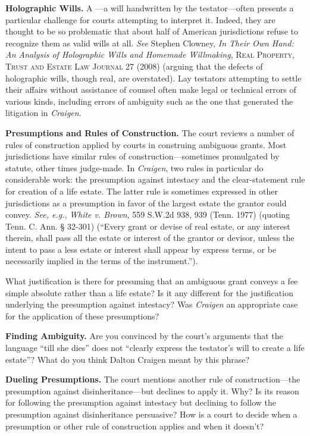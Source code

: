 
\item \textbf{Holographic Wills.} A ---a will handwritten
by the
testator---often presents a particular challenge for courts attempting to
interpret it. Indeed, they are thought to be so problematic that about half of
American jurisdictions refuse to recognize them as valid wills at all.
\textit{See} Stephen Clowney, \textit{In Their Own Hand: An Analysis of
Holographic Wills and Homemade Willmaking}, \textsc{Real Property, Trust and
Estate Law Journal 27} (2008) (arguing that the defects of holographic wills,
though real, are overstated). Lay testators attempting to settle their affairs
without assistance of counsel often make legal or technical errors of various
kinds, including errors of ambiguity such as the one that generated the
litigation in \textit{Craigen}.


\item \textbf{Presumptions and Rules of Construction.} The court reviews a
number of rules of construction applied by courts in construing ambiguous
grants. Most jurisdictions have similar rules of construction---sometimes
promulgated by statute, other times judge-made. In \textit{Craigen}, two rules
in particular do considerable work: the presumption against intestacy and the
clear-statement rule for creation of a life estate. The latter rule is
sometimes expressed in other jurisdictions as a presumption in favor of the
largest estate the grantor could convey. \textit{See, e.g.}, \textit{White v.
Brown}, 559 S.W.2d 938, 939 (Tenn. 1977) (quoting Tenn. C. Ann. {\S} 32-301)
(``Every grant or devise of real estate, or any interest therein, shall pass
all the estate or interest of the grantor or devisor, unless the intent to pass
a less estate or interest shall appear by express terms, or be necessarily
implied in the terms of the instrument.'').


What justification is there for presuming that an ambiguous grant conveys a fee
simple absolute rather than a life estate? Is it any different for the
justification underlying the presumption against intestacy? Was
\textit{Craigen} an appropriate case for the application of these presumptions?



\item \textbf{Finding Ambiguity.} Are you convinced by the court's arguments
that the language ``till she dies'' does not ``clearly express the testator's
will to create a life estate''? What do you think Dalton Craigen meant by this
phrase?


\item \textbf{Dueling Presumptions.} The court mentions another rule of
construction---the presumption against disinheritance---but declines to apply
it. Why? Is its reason for following the presumption against intestacy but
declining to follow the presumption against disinheritance persuasive? How is a
court to decide when a presumption or other rule of construction applies and
when it doesn't?

